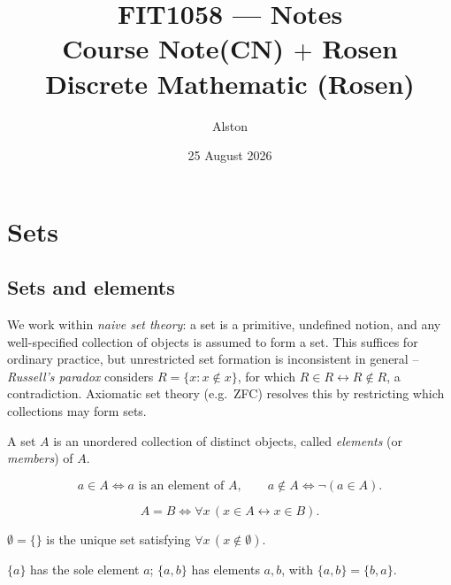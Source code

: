 \documentclass[11pt]{article}
\title{FIT1058 --- Notes\\
\large Course Note(CN) $+$ Rosen Discrete Mathematic (Rosen)}
\author{Alston}
\date{25 August 2026}
\begin{document}
\maketitle
\tableofcontents
\newpage

\section{Sets}
\subsection{Sets and elements}
\label{sec:1-1}

\begin{note}
We work within \emph{naive set theory}: a set is a primitive, undefined notion, and any well-specified collection of objects is assumed to form a set. This suffices for ordinary practice, but unrestricted set formation is inconsistent in general -- \emph{Russell's paradox} considers $R = \{x : x \notin x\}$, for which $R \in R \leftrightarrow R \notin R$, a contradiction. Axiomatic set theory (e.g.\ ZFC) resolves this by restricting which collections may form sets.
\end{note}

\begin{definition}[Set]
A set $A$ is an unordered collection of distinct objects, called \emph{elements} (or \emph{members}) of $A$.
\end{definition}

\begin{definition}[Membership]
\[
a \in A \iff a \text{ is an element of } A, \qquad
a \notin A \iff \neg(a \in A).
\]
\end{definition}

\begin{definition}
\[
A = B \iff \forall x\, (x \in A \leftrightarrow x \in B).
\]
\end{definition}

\begin{definition}
$\emptyset = \{\}$ is the unique set satisfying $\forall x\, (x \notin \emptyset)$.
\end{definition}

\begin{definition}
$\{a\}$ has the sole element $a$; $\{a,b\}$ has elements $a,b$, with $\{a,b\} = \{b,a\}$.
\end{definition}
\end{document}
